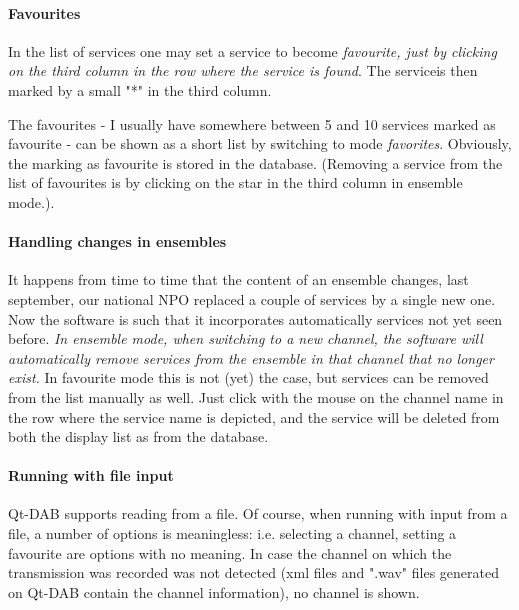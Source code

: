 \documentclass[11pt]{article}
\begin{document}
\paragraph{Favourites}
In the list of services one may set a service to become {\em favourite, just by clicking on the third column in the row where the service is found}.
The serviceis then marked by a small "*" in the third column.
\par
The favourites - I usually have somewhere between 5 and 10 services marked as favourite - can be shown as a short list by switching to mode {\em favorites}.
Obviously, the marking as favourite is stored in the database. (Removing a service from the list of favourites is by clicking on the star in the third column in ensemble mode.).
\paragraph{Handling changes in ensembles}
It happens from time to time that the content of an ensemble changes, last september, our national NPO replaced a couple of services by a single new one.
Now the software is such that it incorporates automatically services not yet seen before.
{\em In ensemble mode, when switching to a new channel, the software will automatically remove services from the ensemble in that channel that no longer exist.}
In favourite mode this is not (yet) the case, but services can be removed from the list manually as well.
Just click with the mouse on the channel name in the row where the service name is depicted, and the service will be deleted from both the display list as from the database.

\paragraph{Running with file input}
Qt-DAB supports reading from a file. Of course, when running with input from a file, a number of options is meaningless: i.e. selecting a channel, setting a favourite are options with no meaning.
In case the channel on which the transmission was recorded was not detected (xml files and ".wav" files generated on Qt-DAB contain the channel information), no channel is shown.
\end{document}
